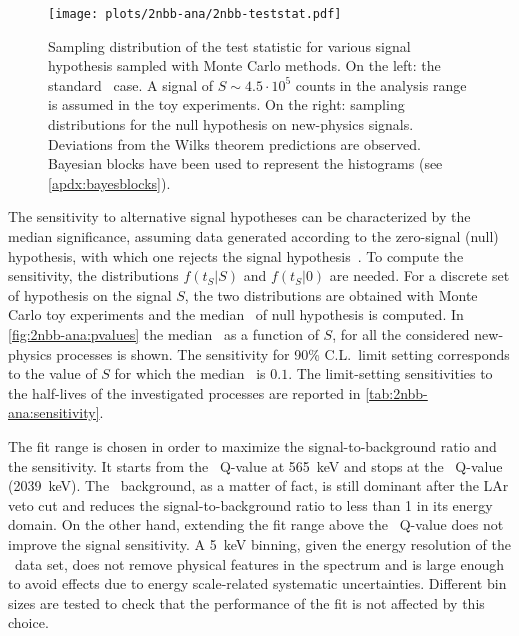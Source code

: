 \begin{figure}
  \centering
  \texttt{[image: plots/2nbb-ana/2nbb-teststat.pdf]}
  \caption{%
    Sampling distribution of the test statistic for various signal hypothesis sampled with
    Monte Carlo methods. On the left: the standard \nnbb\ case. A signal of $S \sim 4.5
    \cdot 10^5$ counts in the analysis range is assumed in the toy experiments. On the
    right: sampling distributions for the null hypothesis on new-physics signals.
    Deviations from the Wilks theorem predictions are observed. Bayesian blocks have been
    used to represent the histograms (see \cref{apdx:bayesblocks}). 
  }\label{fig:2nbb-ana:ts-dist}
\end{figure}

The sensitivity to alternative signal hypotheses can be characterized by the median
significance, assuming data generated according to the zero-signal (null) hypothesis, with
which one rejects the signal hypothesis~\cite{Cowan2011}. To compute the sensitivity, the
distributions $f(t_S|S)$ and $f(t_S|0)$ are needed. For a discrete set of hypothesis on
the signal $S$, the two distributions are obtained with Monte Carlo toy experiments and
the median \pvalue\ of null hypothesis is computed. In \cref{fig:2nbb-ana:pvalues} the
median \pvalue\ as a function of $S$, for all the considered new-physics processes is
shown. The sensitivity for 90\% C.L.~limit setting corresponds to the value of $S$ for
which the median \pvalue\ is $0.1$. The limit-setting sensitivities to the half-lives of
the investigated processes are reported in \cref{tab:2nbb-ana:sensitivity}.

The fit range is chosen in order to maximize the signal-to-background ratio and the
sensitivity. It starts from the \Arl\ Q-value at 565~keV and stops at the \nnbb\ Q-value
(2039~keV). The \Arl\ background, as a matter of fact, is still dominant after the LAr
veto cut and reduces the signal-to-background ratio to less than 1 in its energy domain.
On the other hand, extending the fit range above the \nnbb\ Q-value does not improve the
signal sensitivity.
\newpar
A 5~keV binning, given the energy resolution of the \enrBEGeII\ data set, does not
remove physical features in the spectrum and is large enough to avoid effects due to
energy scale-related systematic uncertainties. Different bin sizes are tested
to check that the performance of the fit is not affected by this choice.

